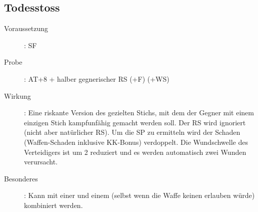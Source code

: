 \subsection{Todesstoss}
\label{aktion.todesstoss}
\begin{description}
    \item[Voraussetzung]:
        SF 
    \item[Probe]:
        AT+8 + halber gegnerischer RS (+F) (+WS)
    \item[Wirkung]:
        Eine riskante Version des gezielten Stichs, mit dem der Gegner mit einem einzigen Stich kampfunfähig gemacht werden soll.
        Der RS wird ignoriert (nicht aber natürlicher RS).
        Um die SP zu ermitteln wird der Schaden (Waffen-Schaden inklusive KK-Bonus) verdoppelt.
        Die Wundschwelle des Verteidigers ist um 2 reduziert und es werden automatisch zwei Wunden verursacht.
    \item[Besonderes]:
        Kann mit einer  und einem  (selbst wenn die Waffe keinen  erlauben würde) kombiniert werden.
\end{description}
